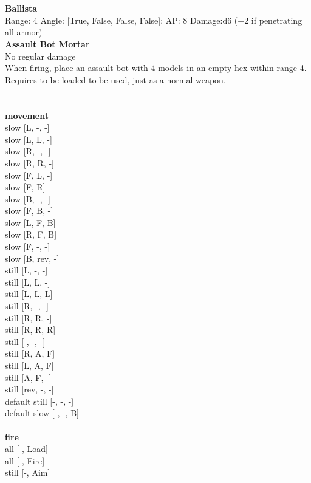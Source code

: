 \ \\

\ \\
{\bf Ballista } \\



Range: 4  Angle: [True, False, False, False]: AP: 8 Damage:d6 (+2 if penetrating all armor) \\




{\bf Assault Bot Mortar } \\

No regular damage\\ 
When firing, place an assault bot with 4 models in an empty hex within range 4. Requires to be loaded to be used, just as a normal weapon.\\ 





 
\ \\



\ \\ {\bf movement } \\
slow [L, -, -] \\
slow [L, L, -] \\
slow [R, -, -] \\
slow [R, R, -] \\
slow [F, L, -] \\
slow [F, R] \\
slow [B, -, -] \\
slow [F, B, -] \\
slow [L, F, B] \\
slow [R, F, B] \\
slow [F, -, -] \\
slow [B, rev, -] \\
still [L, -, -] \\
still [L, L, -] \\
still [L, L, L] \\
still [R, -, -] \\
still [R, R, -] \\
still [R, R, R] \\
still [-, -, -] \\
still [R, A, F] \\
still [L, A, F] \\
still [A, F, -] \\
still [rev, -, -] \\
default still [-, -, -] \\
default slow [-, -, B] \\
\ \\ {\bf fire } \\
all [-, Load] \\
all [-, Fire] \\
still [-, Aim] \\


